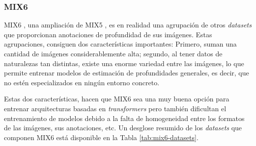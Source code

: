 \subsubsection{MIX6}
MIX6 \cite{visiontransformersDPT}, una ampliación de MIX5 \cite{midas-intel}, es en realidad una agrupación de otros \textit{datasets} que proporcionan anotaciones de profundidad de sus imágenes. Estas agrupaciones, consiguen dos características importantes: Primero, suman una cantidad de imágenes considerablemente alta; segundo, al tener datos de naturalezas tan distintas, existe una enorme variedad entre las imágenes, lo que permite entrenar modelos de estimación de profundidades generales, es decir, que no estén especializados en ningún entorno concreto. 

Estas dos características, hacen que MIX6 sea una muy buena opción para entrenar arquitecturas basadas en \textit{transformers} pero también dificultan el entrenamiento de modelos debido a la falta de homogeneidad entre los formatos de las imágenes, sus anotaciones, etc. Un desglose resumido de los \textit{datasets} que componen MIX6 está disponible en la Tabla \ref{tab:mix6-datasets}.

